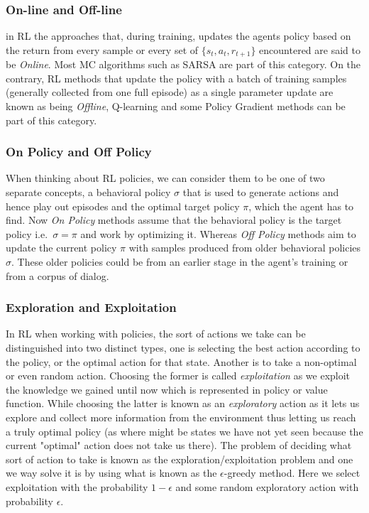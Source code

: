 \documentclass[12pt]{extarticle}
\numberwithin{equation}{section}
\begin{document}
	\subsubsection{On-line and Off-line}
	in RL the approaches that, during training, updates the agents policy based on the return from every sample or every set of $\{s_t,a_t,r_{t+1}\}$ encountered are said to be \textit{Online}. Most MC algorithms such as SARSA are part of this category. On the contrary, RL methods that update the policy with a batch of training samples (generally collected from one full episode) as a single parameter update are known as being \textit{Offline}, Q-learning and some Policy Gradient methods can be part of this category.
	\subsubsection{On Policy and Off Policy}
	When thinking about RL policies, we can consider them to be one of two separate concepts, a behavioral policy $\sigma$ that is used to generate actions and hence play out episodes and the optimal target policy $\pi$, which the agent has to find. Now \textit{On Policy} methods assume that the behavioral policy is the target policy i.e.\ $\sigma = \pi$ and work by optimizing it. Whereas \textit{Off Policy} methods aim to update the current policy $\pi$ with samples produced from older behavioral policies $\sigma$. These older policies could be from an earlier stage in the agent's training or from a corpus of dialog. 
	\subsubsection{Exploration and Exploitation}
	In RL when working with policies, the sort of actions we take can be distinguished into two distinct types, one is selecting the best action according to the policy, or the optimal action for that state. Another is to take a non-optimal or even random action. Choosing the former is called \textit{exploitation} as we exploit the knowledge we gained until now which is represented in policy or value function. While choosing the latter is known as an \textit{exploratory} action as it lets us explore and collect more information from the environment thus letting us reach a truly optimal policy (as where might be states we have not yet seen because the current "optimal" action does not take us there). The problem of deciding what sort of action to take is known as the exploration/exploitation problem and one we way solve it is by using what is known as the $\epsilon$-greedy method. Here we select exploitation with the probability $1-\epsilon$ and some random exploratory action with probability $\epsilon$. 
	\pagebreak
	
\end{document}
